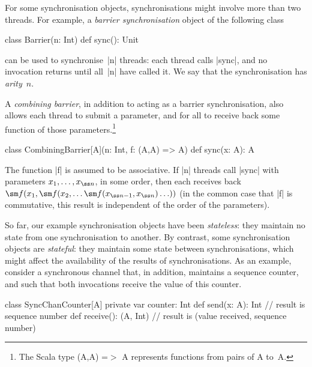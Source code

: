 For some synchronisation objects, synchronisations might involve more than two
threads.  For example, a \emph{barrier synchronisation} object of the
following class
%
\begin{scala}
class Barrier(n: Int){
  def sync(): Unit
}
\end{scala}
%
can be used to synchronise~|n| threads: each thread calls |sync|, and no
invocation returns until all~|n| have called it.  We say that the
synchronisation has \emph{arity}~$n$.

A \emph{combining barrier}, in addition to acting as a barrier
synchronisation, also allows each thread to submit a parameter, and for all to
receive back some function of those parameters.\footnote{The Scala type
  {\scalastyle (A,A) =}$>$ {\scalastyle A} represents functions from pairs of
  {\scalastyle A} to~{\scalastyle A}.}
%
\begin{scala}
class CombiningBarrier[A](n: Int, f: (A,A) => A){
  def sync(x: A): A
}
\end{scala}
%
The function |f| is assumed to be associative.  If |n| threads call |sync|
with parameters $x_1, \ldots, x_{\ss n}$, in some order, then each receives
back $\sm f(x_1, \sm f(x_2, \ldots \sm f(x_{{\ss n}-1}, x_{\ss n}) \ldots ))$
(in the common case that |f| is commutative, this result is independent of the
order of the parameters).

So far, our example synchronisation objects have been \emph{stateless}: they
maintain no state from one synchronisation to another.  By contrast, some
synchronisation objects are \emph{stateful}: they maintain some state between
synchronisations, which might affect the availability of the results of
synchronisations.  As an example, consider a synchronous channel that, in
addition, maintains a sequence counter, and such that both invocations receive
the value of this counter.
\begin{scala}
class SyncChanCounter[A]{
  private var counter: Int
  def send(x: A): Int      // result is sequence number
  def receive(): (A, Int)  // result is (value received, sequence number)
}
\end{scala}



